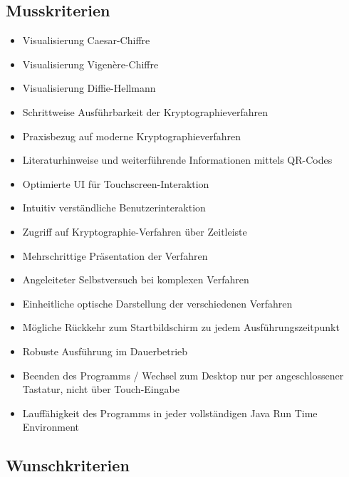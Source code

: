\documentclass{article}
\begin{document}
\subsection{Musskriterien}

\begin{itemize}
    \item Visualisierung Caesar-Chiffre
    \item Visualisierung Vigenère-Chiffre
    \item Visualisierung Diffie-Hellmann
    \item Schrittweise Ausführbarkeit der Kryptographieverfahren
    \item Praxisbezug auf moderne Kryptographieverfahren
    \item Literaturhinweise und weiterführende Informationen mittels QR-Codes
    \item Optimierte \gls{UI} für Touchscreen-Interaktion
    \item Intuitiv verständliche Benutzerinteraktion
    \item Zugriff auf Kryptographie-Verfahren über Zeitleiste
    \item Mehrschrittige Präsentation der Verfahren
    \item Angeleiteter Selbstversuch bei komplexen Verfahren
    \item Einheitliche optische Darstellung der verschiedenen Verfahren
    \item Mögliche Rückkehr zum Startbildschirm zu jedem Ausführungszeitpunkt
    \item Robuste Ausführung im Dauerbetrieb
    \item Beenden des Programms / Wechsel zum Desktop nur per angeschlossener Tastatur, nicht über Touch-Eingabe
    \item Lauffähigkeit des Programms in jeder vollständigen Java Run Time Environment
\end{itemize}

\subsection{Wunschkriterien}
\end{document}
